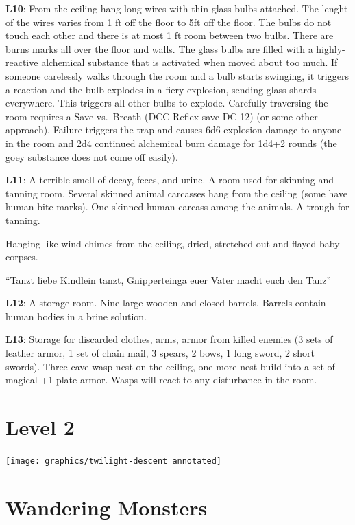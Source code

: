 \documentclass[
]{book}
\begin{document}
\textbf{L10}: From the ceiling hang long wires with thin glass bulbs attached. The lenght of the wires varies from 1 ft off the floor to 5ft off the floor. The bulbs do not touch each other and there is at most 1 ft room between two bulbs. There are burns marks all over the floor and walls. The glass bulbs are filled with a highly-reactive alchemical substance that is activated when moved about too much. If someone carelessly walks through the room and a bulb starts swinging, it triggers a reaction and the bulb explodes in a fiery explosion, sending glass shards everywhere. This triggers all other bulbs to explode. Carefully traversing the room requires a Save vs.~Breath (DCC Reflex save DC 12) (or some other approach). Failure triggers the trap and causes 6d6 explosion damage to anyone in the room and 2d4 continued alchemical burn damage for 1d4+2 rounds (the goey substance does not come off easily).

\textbf{L11}: A terrible smell of decay, feces, and urine. A room used for skinning and tanning room. Several skinned animal carcasses hang from the ceiling (some have human bite marks). One skinned human carcass among the animals. A trough for tanning.

Hanging like wind chimes from the ceiling, dried, stretched out and flayed baby corpses.

``Tanzt liebe Kindlein tanzt, Gnipperteinga euer Vater macht euch den Tanz''

\textbf{L12}: A storage room. Nine large wooden and closed barrels. Barrels contain human bodies in a brine solution.

\textbf{L13}: Storage for discarded clothes, arms, armor from killed enemies (3 sets of leather armor, 1 set of chain mail, 3 spears, 2 bows, 1 long sword, 2 short swords). Three cave wasp nest on the ceiling, one more nest build into a set of magical +1 plate armor. Wasps will react to any disturbance in the room.

\section{Level 2}\label{level-2}

\begin{center}\texttt{[image: graphics/twilight-descent annotated]} \end{center}

\section{Wandering Monsters}\label{wandering-monsters-1}
\end{document}
